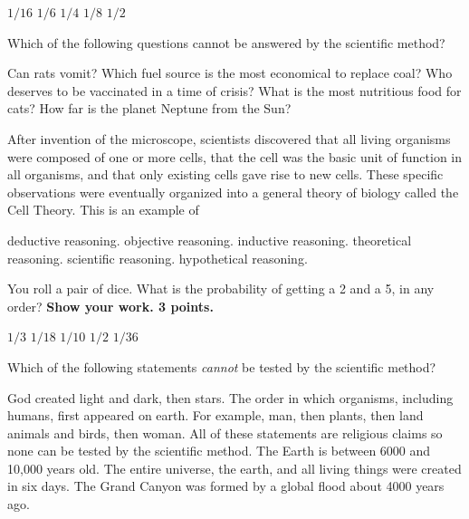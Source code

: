 \begin{choices}
\choice $1/16$
\choice $1/6$
\choice $1/4$
\correctchoice $1/8$
\choice $1/2$
\end{choices}

\question
Which of the following questions cannot be answered by the scientific method?

\begin{choices}
\choice Can rats vomit?
\choice Which fuel source is the most economical to replace coal?
\correctchoice Who deserves to be vaccinated in a time of crisis?
\choice What is the most nutritious food for cats?
\choice How far is the planet Neptune from the Sun?
\end{choices}

\newpage

\question
After invention of the microscope, scientists discovered that all living organisms were composed of one or more cells, that the cell was the basic unit of function in all organisms, and that only existing cells gave rise to new cells. These specific observations were eventually organized into a general theory of biology called the Cell Theory. This is an example of 

\begin{choices}
\choice deductive reasoning.
\choice objective reasoning.
\correctchoice inductive reasoning.
\choice theoretical reasoning.
\choice scientific reasoning.
\choice hypothetical reasoning.
\end{choices}


\question
You roll a pair of dice.  What is the probability of getting a 2 and a 5, in any order? \textbf{Show your work.  3 points.}

\begin{choices}
\choice $1/3$
\correctchoice $1/18$
\choice $1/10$
\choice $1/2$
\choice $1/36$
\end{choices}

\question
Which of the following statements \emph{cannot} be tested by the scientific method?

\begin{choices}
\correctchoice God created light and dark, then stars.
\choice The order in which organisms, including humans, first appeared on earth. For example, man, then plants, then land animals and birds, then woman.
\choice All of these statements are religious claims so none can be tested by the scientific method.
\choice The Earth is between 6000 and 10,000 years old.
\choice The entire universe, the earth, and all living things were created in six days.
\choice The Grand Canyon was formed by a global flood about 4000 years ago.
\end{choices}

